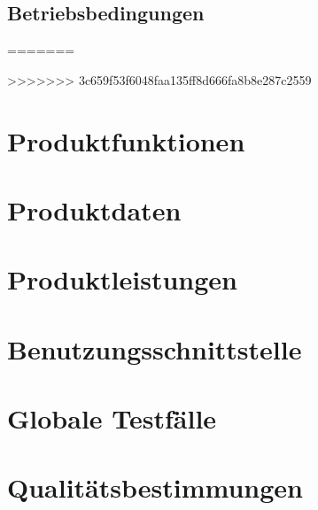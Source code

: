 \documentclass[a4paper]{scrreprt}
\begin{document}
\section{Betriebsbedingungen}
=======



>>>>>>> 3c659f53f6048faa135ff8d666fa8b8e287c2559



\chapter{Produktfunktionen}

\chapter{Produktdaten}

\chapter{Produktleistungen}

\chapter{Benutzungsschnittstelle}

\chapter{Globale Testfälle}

\chapter{Qualitätsbestimmungen}


\clearpage
\printglossary[type=\acronymtype]
\printglossary

\listoffigures
\end{document}
